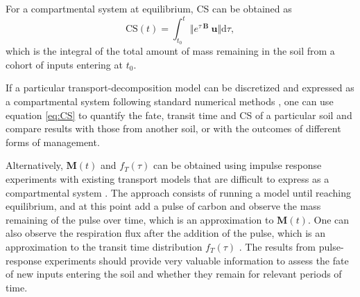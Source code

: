 \documentclass[11pt, oneside, a4paper]{article}   	%
\providecommand{\DIFaddtex}[1]{{\protect\color{blue}\uwave{#1}}} %
\providecommand{\DIFdeltex}[1]{{\protect\color{red}\sout{#1}}}                      %
\providecommand{\DIFaddbegin}{} %
\providecommand{\DIFaddend}{} %
\providecommand{\DIFdelbegin}{} %
\providecommand{\DIFdelend}{} %
\providecommand{\DIFadd}[1]{\texorpdfstring{\DIFaddtex{#1}}{#1}} %
\providecommand{\DIFdel}[1]{\texorpdfstring{\DIFdeltex{#1}}{}} %
\newcommand{\DIFscaledelfig}{0.5}
\newlength{\DIFdelgraphicswidth} %
\newlength{\DIFdelgraphicsheight} %
\newcommand{\DIFaddincludegraphics}[2][]{{\color{blue}\fbox{\DIFOincludegraphics[#1]{#2}}}} %
\newcommand{\DIFdelincludegraphics}[2][]{%
\sbox{\DIFdelgraphicsbox}{\DIFOincludegraphics[#1]{#2}}%
\settoboxwidth{\DIFdelgraphicswidth}{\DIFdelgraphicsbox} %
\settoboxtotalheight{\DIFdelgraphicsheight}{\DIFdelgraphicsbox} %
\scalebox{\DIFscaledelfig}{%
\parbox[b]{\DIFdelgraphicswidth}{\usebox{\DIFdelgraphicsbox}\\[-\baselineskip] \rule{\DIFdelgraphicswidth}{0em}}\llap{\resizebox{\DIFdelgraphicswidth}{\DIFdelgraphicsheight}{%
\setlength{\unitlength}{\DIFdelgraphicswidth}%
\begin{picture}(1,1)%
\thicklines\linethickness{2pt} %
{\color[rgb]{1,0,0}\put(0,0){\framebox(1,1){}}}%
{\color[rgb]{1,0,0}\put(0,0){\line( 1,1){1}}}%
{\color[rgb]{1,0,0}\put(0,1){\line(1,-1){1}}}%
\end{picture}%
}\hspace*{3pt}}} %
} %
\DeclareRobustCommand{\DIFaddbegin}{\DIFOaddbegin \let\includegraphics\DIFaddincludegraphics} %
\DeclareRobustCommand{\DIFaddend}{\DIFOaddend \let\includegraphics\DIFOincludegraphics} %
\DeclareRobustCommand{\DIFdelbegin}{\DIFOdelbegin \let\includegraphics\DIFdelincludegraphics} %
\DeclareRobustCommand{\DIFdelend}{\DIFOaddend \let\includegraphics\DIFOincludegraphics} %
\begin{document}
For a compartmental system at equilibrium, CS can be obtained as \DIFaddbegin \DIFadd{\mbox{%
\citep{Sierra2021BGS}
}\hskip0pt%
}\DIFaddend \begin{equation} \label{eq:CS}
 \mathrm{CS}(t) = \int_{t_0}^t \Vert e^{\tau \ \mathbf{B}} \ \bm{u} \Vert \mathrm{d} \tau,
\end{equation}
which is the integral of the total amount of mass remaining in the soil from a cohort of inputs entering at $t_0$.

If a particular transport-decomposition model can be discretized and expressed as a compartmental system following standard numerical methods \citep{LeVeque2007, Lanczos}, one can use equation \ref{eq:CS} to quantify the fate, transit time and CS of a particular soil and compare results with those from another soil, or with the outcomes of different forms of management. 

Alternatively, \DIFdelbegin \DIFdel{$\bm{M}(t)$ }\DIFdelend \DIFaddbegin \DIFadd{$\bm{m}(t)$ }\DIFaddend and $f_T(\tau)$ can be obtained using impulse response experiments with existing transport models that are difficult to express as a compartmental system \citep{Thompson1999, Metzler2018MG}. The approach consists of running a model until reaching equilibrium, and at this point add a pulse of carbon and observe the mass remaining of the pulse over time, which is an approximation to \DIFdelbegin \DIFdel{$\bm{M}(t) $}\DIFdelend \DIFaddbegin \DIFadd{$\bm{m}(t) $}\DIFaddend . One can also observe the respiration flux after the addition of the pulse, which is an approximation to the transit time distribution $f_T(\tau)$ \citep{Metzler2018MG}. The results from pulse-response experiments should provide very valuable information to assess the fate of new inputs entering the soil and whether they remain for relevant periods of time. 


\end{document}
